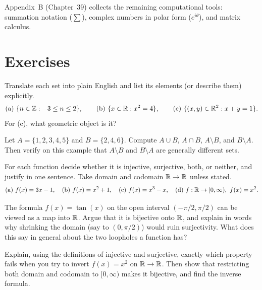Appendix~B (Chapter~39) collects the remaining computational tools: summation notation
($\sum$), complex numbers in polar form ($e^{i\theta}$), and matrix calculus.

\section{Exercises}

\begin{exercise}
Translate each set into plain English and list its elements (or describe them) explicitly.
\[
  \text{(a) } \{n \in \mathbb{Z} : -3 \le n \le 2\}, \qquad
  \text{(b) } \{x \in \mathbb{R} : x^2 = 4\}, \qquad
  \text{(c) } \{(x,y)\in\mathbb{R}^2 : x + y = 1\}.
\]
For (c), what geometric object is it?
\end{exercise}

\begin{exercise}
Let $A = \{1,2,3,4,5\}$ and $B = \{2,4,6\}$. Compute $A \cup B$, $A \cap B$, $A \setminus
B$, and $B \setminus A$. Then verify on this example that $A \setminus B$ and $B \setminus
A$ are generally different sets.
\end{exercise}

\begin{exercise}
For each function decide whether it is injective, surjective, both, or neither, and justify
in one sentence. Take domain and codomain $\mathbb{R} \to \mathbb{R}$ unless stated.
\[
  \text{(a) } f(x) = 3x - 1, \quad
  \text{(b) } f(x) = x^2 + 1, \quad
  \text{(c) } f(x) = x^3 - x, \quad
  \text{(d) } f:\mathbb{R}\to[0,\infty),\ f(x)=x^2.
\]
\end{exercise}

\begin{exercise}
The formula $f(x) = \tan(x)$ on the open interval $(-\pi/2, \pi/2)$ can be viewed as a map
into $\mathbb{R}$. Argue that it is bijective onto $\mathbb{R}$, and explain in words why shrinking the
domain (say to $(0,\pi/2)$) would ruin surjectivity. What does this say in general about
the two loopholes a function has?
\end{exercise}

\begin{exercise}
Explain, using the definitions of injective and surjective, exactly which property fails
when you try to invert $f(x) = x^2$ on $\mathbb{R}\to\mathbb{R}$. Then show that restricting both domain
and codomain to $[0,\infty)$ makes it bijective, and find the inverse formula.
\end{exercise}

